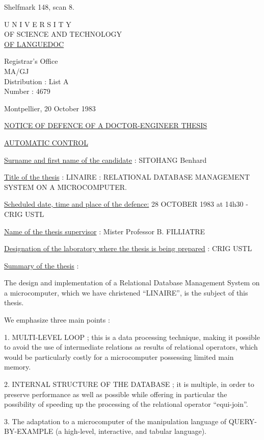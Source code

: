 Shelfmark 148, scan 8.


\begin{center}
U N I V E R S I T Y\\
OF SCIENCE AND TECHNOLOGY\\
\uline{OF LANGUEDOC}

Registrar's Office\\
MA/GJ\\
Distribution : List A\\
Number : 4679
\end{center}

Montpellier, 20 October 1983

\begin{center}
\uline{NOTICE OF DEFENCE OF A DOCTOR-ENGINEER THESIS}

\uline{AUTOMATIC CONTROL}
\end{center}

\uline{Surname and first name of the candidate} : SITOHANG Benhard

\uline{Title of the thesis} : LINAIRE : RELATIONAL DATABASE MANAGEMENT SYSTEM ON A MICROCOMPUTER.

\uline{Scheduled date, time and place of the defence:} 28 OCTOBER 1983 at 14h30 - CRIG USTL

\uline{Name of the thesis supervisor} : Mister Professor B. FILLIATRE

\uline{Designation of the laboratory where the thesis is being prepared} : CRIG USTL

\uline{Summary of the thesis} :

The design and implementation of a Relational Database Management System on a microcomputer, which we have christened ``LINAIRE'', is the subject of this thesis.

We emphasize three main points :

1. MULTI-LEVEL LOOP ; this is a data processing technique, making it possible to avoid the use of intermediate relations as results of relational operators, which would be particularly costly for a microcomputer possessing limited main memory.

2. INTERNAL STRUCTURE OF THE DATABASE ; it is multiple, in order to preserve performance as well as possible while offering in particular the possibility of speeding up the processing of the relational operator ``equi-join''.

3. The adaptation to a microcomputer of the manipulation language of QUERY-BY-EXAMPLE (a high-level, interactive, and tabular language).

